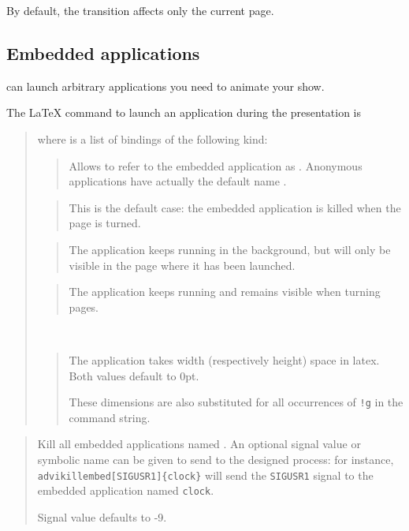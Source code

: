 \documentclass[12pt]{article}
\begin{document}
By default, the transition affects only the current page.

\subsection{Embedded applications}

{\ActiveDVI} can launch arbitrary applications you need to animate your
show.

The {\LaTeX} command to launch an application during the presentation is 

\medskip\noindent
\docdef \adviembed{} 

\begin{quote}
where  is a list of bindings of the following kind:

\begin{quote}
Allows to refer to the embedded application as . 
Anonymous applications have actually the default name .
\end{quote}


\begin{quote}
This is the default case: the embedded application is killed when the page
is turned.
\end{quote}


\begin{quote}
The application keeps running in the background, but will only be visible in
the page where it has been launched.
\end{quote}

\begin{quote}
The application keeps running and remains visible when turning pages.
\end{quote}

\\
\begin{quote}
The application takes  width (respectively height) space in 
latex. Both values default to 0pt.

These dimensions are also substituted for all occurrences of \verb"!g" in
the command string.
\end{quote}

\end{quote}

\medskip\noindent
\docdef \advikillembed {}
\begin{quote}
Kill all embedded applications named .
An optional signal value or symbolic name can be given to send to the
designed process: for instance, {\tt {}advikillembed[SIGUSR1]\{clock\}}
will send the {\tt SIGUSR1} signal to the embedded application named
{\tt clock}.

Signal value defaults to -9.
\end{quote}
\end{document}
